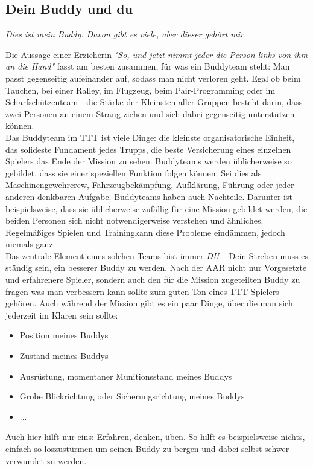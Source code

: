 \newpage
\subsection{Dein Buddy und du}
\centerline{\textit{Dies ist mein Buddy. Davon gibt es viele, aber dieser gehört mir.}}
	Die Aussage einer Erzieherin \textit{"So, und jetzt nimmt jeder die Person links von ihm an die Hand"} fasst am besten zusammen, für was ein Buddyteam steht: Man passt gegenseitig aufeinander auf, sodass man nicht verloren geht. Egal ob beim Tauchen, bei einer Ralley, im Flugzeug, beim Pair-Programming oder im Scharfschützenteam - die Stärke der Kleinsten aller Gruppen besteht darin, dass zwei Personen an einem Strang ziehen und sich dabei gegenseitig unterstützen können. \\
	Das Buddyteam im \ac{TTT} ist viele Dinge: die kleinste organisatorische Einheit, das solideste Fundament jedes Trupps, die beste Versicherung eines einzelnen Spielers das Ende der Mission zu sehen. Buddyteams werden üblicherweise so gebildet, dass sie einer speziellen Funktion folgen können: Sei dies als Maschinengewehrcrew, Fahrzeugbekämpfung, Aufklärung, Führung oder jeder anderen denkbaren Aufgabe. Buddyteams haben auch Nachteile. Darunter ist beispielsweise, dass sie üblicherweise zufällig für eine Mission gebildet werden, die beiden Personen sich nicht notwendigerweise verstehen und ähnliches. Regelmäßiges Spielen und Trainingkann diese Probleme eindämmen, jedoch niemals ganz. \\
	Das zentrale Element eines solchen Teams bist immer \textit{DU} -- Dein Streben muss es ständig sein, ein besserer Buddy zu werden. Nach der AAR nicht nur Vorgesetzte und erfahrenere Spieler, sondern auch den für die Mission zugeteilten Buddy zu fragen was man verbessern kann sollte zum guten Ton eines \ac{TTT}-Spielers gehören. Auch während der Mission gibt es ein paar Dinge, über die man sich jederzeit im Klaren sein sollte:
		\begin{itemize}
			\item Position meines Buddys
			\item Zustand meines Buddys
			\item Ausrüstung, momentaner Munitionsstand meines Buddys
			\item Grobe Blickrichtung oder Sicherungsrichtung meines Buddys
			\item ...
		\end{itemize}
	Auch hier hilft nur eins: Erfahren, denken, üben. So hilft es beispielsweise nichts, einfach so loszustürmen um seinen Buddy zu bergen und dabei selbst schwer verwundet zu werden. 